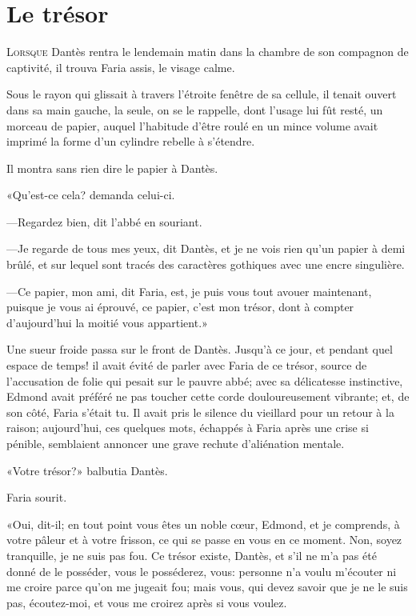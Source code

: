 \chapter{Le trésor}

\lettrine{L}{orsque} Dantès rentra le lendemain matin dans la chambre de son compagnon de captivité, il trouva Faria assis, le visage calme.

\zz
Sous le rayon qui glissait à travers l'étroite fenêtre de sa cellule, il tenait ouvert dans sa main gauche, la seule, on se le rappelle, dont l'usage lui fût resté, un morceau de papier, auquel l'habitude d'être roulé en un mince volume avait imprimé la forme d'un cylindre rebelle à s'étendre.

Il montra sans rien dire le papier à Dantès.

«Qu'est-ce cela? demanda celui-ci.

—Regardez bien, dit l'abbé en souriant.

—Je regarde de tous mes yeux, dit Dantès, et je ne vois rien qu'un papier à demi brûlé, et sur lequel sont tracés des caractères gothiques avec une encre singulière.

—Ce papier, mon ami, dit Faria, est, je puis vous tout avouer maintenant, puisque je vous ai éprouvé, ce papier, c'est mon trésor, dont à compter d'aujourd'hui la moitié vous appartient.»

Une sueur froide passa sur le front de Dantès. Jusqu'à ce jour, et pendant quel espace de temps! il avait évité de parler avec Faria de ce trésor, source de l'accusation de folie qui pesait sur le pauvre abbé; avec sa délicatesse instinctive, Edmond avait préféré ne pas toucher cette corde douloureusement vibrante; et, de son côté, Faria s'était tu. Il avait pris le silence du vieillard pour un retour à la raison; aujourd'hui, ces quelques mots, échappés à Faria après une crise si pénible, semblaient annoncer une grave rechute d'aliénation mentale.

«Votre trésor?» balbutia Dantès.

Faria sourit.

«Oui, dit-il; en tout point vous êtes un noble cœur, Edmond, et je comprends, à votre pâleur et à votre frisson, ce qui se passe en vous en ce moment. Non, soyez tranquille, je ne suis pas fou. Ce trésor existe, Dantès, et s'il ne m'a pas été donné de le posséder, vous le posséderez, vous: personne n'a voulu m'écouter ni me croire parce qu'on me jugeait fou; mais vous, qui devez savoir que je ne le suis pas, écoutez-moi, et vous me croirez après si vous voulez.

